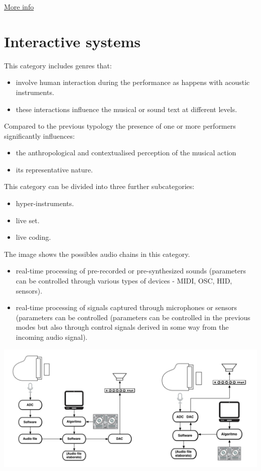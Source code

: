 \href{img/gaming.pdf}{More info}

\section{Interactive systems }\label{interactive-systems}

This category includes genres that:

\begin{itemize}
\tightlist
\item involve human interaction during the performance as happens with acoustic instruments.
\item these interactions influence the musical or sound text at different levels.
\end{itemize}

Compared to the previous typology the presence of one or more performers significantly influences:

\begin{itemize}
\tightlist
\item the anthropological and contextualised perception of the musical action
\item its representative nature.
\end{itemize}

This category can be divided into three further subcategories:

\begin{itemize}
\tightlist
\item hyper-instruments.
\item live set.
\item live coding.
\end{itemize}

The image shows the possibles audio chains in this category.

\begin{itemize}
\tightlist
\item real-time processing of pre-recorded or pre-synthesized sounds (parameters can be controlled through various types of devices - MIDI, OSC, HID, sensors).
\item real-time processing of signals captured through microphones or sensors (parameters can be controlled (parameters can be controlled in the previous modes but also through control signals derived in some way from the incoming audio signal).
\end{itemize}

\begin{center}
\includegraphics[scale=1]{../img/chain2.png}
\end{center}

